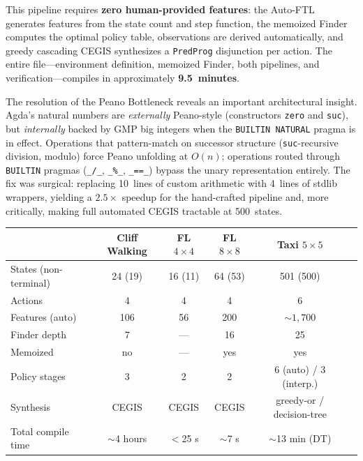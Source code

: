 \noindent This pipeline requires \textbf{zero human-provided features}: the Auto-FTL generates features from the state count and step function, the memoized Finder computes the optimal policy table, observations are derived automatically, and greedy cascading CEGIS synthesizes a \texttt{PredProg} disjunction per action.  The entire file---environment definition, memoized Finder, both pipelines, and verification---compiles in approximately \textbf{9.5~minutes}.

\begin{remark}
\label{rem:builtin-arith}
The resolution of the Peano Bottleneck reveals an important architectural insight.  Agda's natural numbers are \emph{externally} Peano-style (constructors \texttt{zero} and \texttt{suc}), but \emph{internally} backed by GMP big integers when the \texttt{BUILTIN NATURAL} pragma is in effect.  Operations that pattern-match on successor structure (\texttt{suc}-recursive division, modulo) force Peano unfolding at $O(n)$; operations routed through \texttt{BUILTIN} pragmas (\texttt{\_/\_}, \texttt{\_\%\_}, \texttt{\_==\_}) bypass the unary representation entirely.  The fix was surgical: replacing 10~lines of custom arithmetic with 4~lines of stdlib wrappers, yielding a $2.5\times$ speedup for the hand-crafted pipeline and, more critically, making full automated CEGIS tractable at 500~states.
\end{remark}

\begin{center}
\small
\begin{tabular}{@{}lccccc@{}}
& \textbf{Cliff Walking} & \textbf{FL $4{\times}4$} & \textbf{FL $8{\times}8$} & \textbf{Taxi $5{\times}5$} \\
\hline
States (non-terminal) & 24 (19) & 16 (11) & 64 (53) & 501 (500) \\
Actions & 4 & 4 & 4 & 6 \\
Features (auto) & 106 & 56 & 200 & ${\sim}1{,}700$ \\
Finder depth & 7 & --- & 16 & 25 \\
Memoized & no & --- & yes & yes \\
Policy stages & 3 & 2 & 2 & 6 (auto) / 3 (interp.) \\
Synthesis & CEGIS & CEGIS & CEGIS & greedy-or / decision-tree \\
Total compile time & ${\sim}$4 hours & $<$25 s & ${\sim}$7 s & ${\sim}$13 min (DT) \\
\end{tabular}
\end{center}

